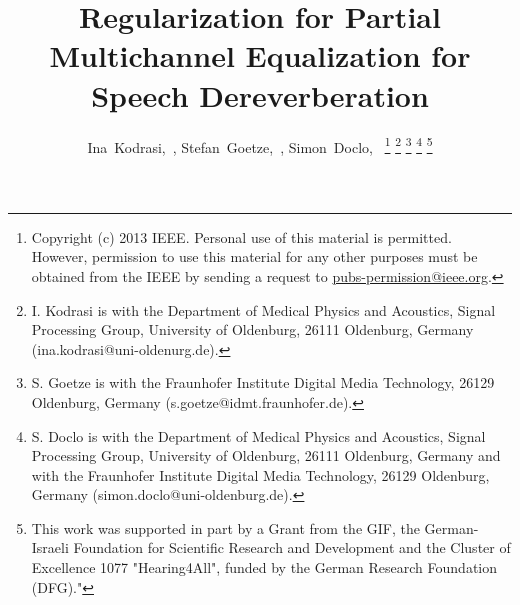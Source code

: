 \documentclass[10pt]{IEEEtran}
\begin{document}
%
\title{Regularization for Partial Multichannel Equalization for Speech Dereverberation}

\author{
  Ina~Kodrasi,~, Stefan~Goetze,~, Simon~Doclo,~
  \thanks{Copyright (c) 2013 IEEE. Personal use of this material is permitted. However, permission to use this material for any other purposes must be obtained from the IEEE by sending a request to \underline{pubs-permission@ieee.org}.}
  \thanks{I. Kodrasi is with the Department of Medical Physics and Acoustics, Signal Processing Group, University of Oldenburg, 26111 Oldenburg, Germany (ina.kodrasi@uni-oldenurg.de).}
  \thanks{S. Goetze is with the Fraunhofer Institute Digital Media Technology, 26129 Oldenburg, Germany (s.goetze@idmt.fraunhofer.de).}
  \thanks{S. Doclo is with the Department of Medical Physics and Acoustics, Signal Processing Group, University of Oldenburg, 26111 Oldenburg, Germany and with the Fraunhofer Institute Digital Media Technology, 26129 Oldenburg, Germany (simon.doclo@uni-oldenburg.de).}%
  \thanks{This work was supported in part by a Grant from the GIF, the German-Israeli Foundation for Scientific
Research and Development and the Cluster of Excellence 1077 "Hearing4All", funded by the German Research Foundation (DFG)."}
}


\maketitle
\newpage
\end{document}
